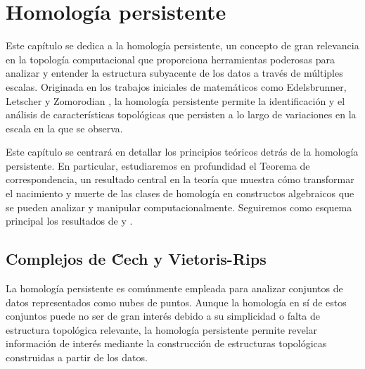 
\chapter{Homología persistente}

Este capítulo se dedica a la homología persistente, un concepto de gran relevancia en la topología computacional que proporciona herramientas poderosas para analizar y entender la estructura subyacente de los datos a través de múltiples escalas. Originada en los trabajos iniciales de matemáticos como Edelsbrunner, Letscher y Zomorodian \cite{edelsbrunner2002topological}, la homología persistente permite la identificación y el análisis de características topológicas que persisten a lo largo de variaciones en la escala en la que se observa.

Este capítulo se centrará en detallar los principios teóricos detrás de la homología persistente. En particular, estudiaremos en profundidad el Teorema de correspondencia, un resultado central en la teoría que muestra cómo transformar el nacimiento y muerte de las clases de homología en constructos algebraicos que se pueden analizar y manipular computacionalmente. Seguiremos como esquema principal los resultados de \cite{zomorodian2004computing} y \cite{dey2022computational}.

\section{Complejos de \u Cech y Vietoris-Rips}

La homología persistente es comúnmente empleada para analizar conjuntos de datos representados como nubes de puntos. Aunque la homología en sí de estos conjuntos puede no ser de gran interés debido a su simplicidad o falta de estructura topológica relevante, la homología persistente permite revelar información de interés mediante la construcción de estructuras topológicas construidas a partir de los datos.

